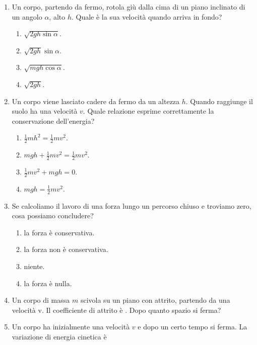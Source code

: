 \documentclass{article}
\begin{document}
\begin{enumerate}
  \item Un corpo, partendo da fermo, rotola giù dalla cima di un piano inclinato di un angolo $\alpha$, alto $h$. Quale è la sua velocità quando arriva in fondo?
  \begin{enumerate}[label=\Alph*.]
    \item $\sqrt{2gh\sin\alpha}$.
    \item $\sqrt{2gh}\sin\alpha$.
    \item $\sqrt{mgh\cos\alpha}$.
    \item $\sqrt{2gh}$.
  \end{enumerate}
  \item Un corpo viene lasciato cadere da fermo da un altezza $h$. Quando raggiunge il suolo ha una velocità $v$. Quale relazione esprime correttamente la conservazione dell'energia?
  \begin{enumerate}[label=\Alph*.]
    \item $\frac{1}{2}mh^2=\frac{1}{2}mv^2$.
    \item $mgh+\frac{1}{2}mv^2=\frac{1}{2}mv^2.$
    \item $\frac{1}{2}mv^2+mgh=0.$
    \item $mgh=\frac{1}{2}mv^2$.
  \end{enumerate}
  \item Se calcoliamo il lavoro di una forza lungo un percorso chiuso e troviamo zero, cosa possiamo concludere?
  \begin{enumerate}[label=\Alph*.]
    \item la forza è conservativa.
    \item la forza non è conservativa.
    \item niente.
    \item la forza è nulla.
  \end{enumerate}
  \item Un corpo di massa $m$ scivola su un piano con attrito, partendo da una velocità v. Il coefficiente di attrito è \mu. Dopo quanto spazio si ferma?
  \begin{enumerate}[label=\Alph*.]
    \item $\frac{1}{2}v^2+\mu g$.
    \item $\frac{2v^2}{g\mu}}$.
    \item $\frac{1}{2}v^2-\mu g$.
    \item $\frac{v^2}{2g\mu}}$.
  \end{enumerate}
  \item Un corpo ha inizialmente una velocità $v$ e dopo un certo tempo si ferma. La variazione di energia cinetica è

\end{enumerate}
\end{document}
